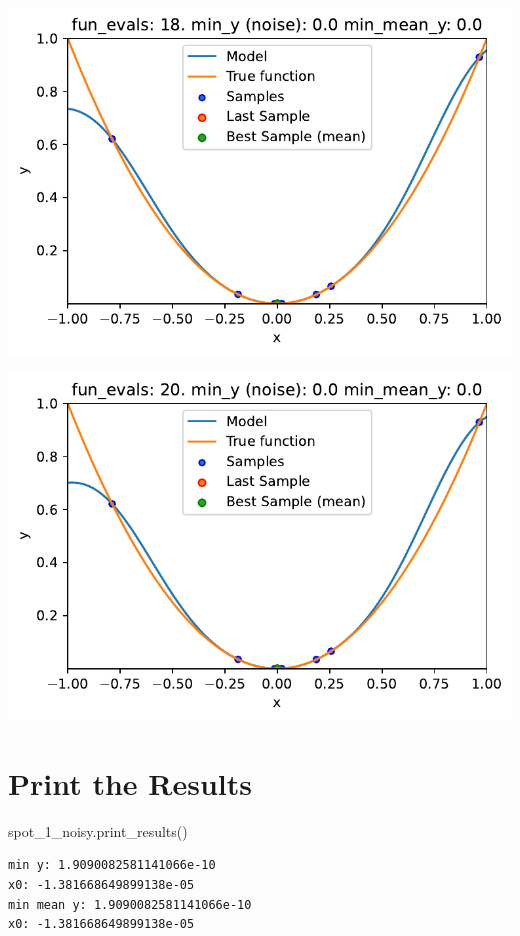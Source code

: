 \documentclass[
  letterpaper,
  DIV=11,
  numbers=noendperiod]{scrreprt}
\newenvironment{Shaded}{\begin{snugshade}}{\end{snugshade}}
\newcommand{\NormalTok}[1]{\textcolor[rgb]{0.00,0.23,0.31}{#1}}
\begin{document}
\includegraphics{014_num_spot_ocba_files/figure-pdf/cell-6-output-8.pdf}

\includegraphics{014_num_spot_ocba_files/figure-pdf/cell-6-output-9.pdf}

\section{Print the Results}\label{print-the-results-4}

\begin{Shaded}
\begin{Highlighting}[]
\NormalTok{spot\_1\_noisy.print\_results()}
\end{Highlighting}
\end{Shaded}

\begin{verbatim}
min y: 1.9090082581141066e-10
x0: -1.381668649899138e-05
min mean y: 1.9090082581141066e-10
x0: -1.381668649899138e-05
\end{verbatim}
\end{document}
